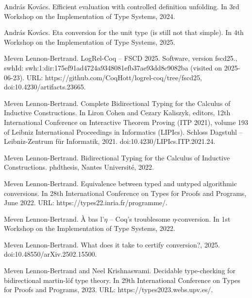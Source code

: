 \par\noindent  [27]  András Kovács.  Efficient evaluation with controlled definition unfolding.  In 3rd Workshop on the Implementation of Type Systems, 2024.  
 
\par\noindent  [28]  András Kovács.  Eta conversion for the unit type (is still not that simple).  In 4th Workshop on the Implementation of Type Systems, 2025.  
 
\par\noindent  [29]  Meven Lennon-Bertrand.  LogRel-Coq – FSCD 2025.  Software, version fscd25., swhId: swh:1:dir:175ef91ad4724a9348081efb37ae93dd8c9082ba (visited on 2025-06-23).  URL: https://github.com/CoqHott/logrel-coq/tree/fscd25, doi:10.4230/artifacts.23665.  
 
\par\noindent  [30]  Meven Lennon-Bertrand.  Complete Bidirectional Typing for the Calculus of Inductive Constructions.  In Liron Cohen and Cezary Kaliszyk, editors, 12th International Conference on Interactive Theorem Proving (ITP 2021), volume 193 of Leibniz International Proceedings in Informatics (LIPIcs). Schloss Dagstuhl – Leibniz-Zentrum für Informatik, 2021.  doi:10.4230/LIPIcs.ITP.2021.24.  
 
\par\noindent  [31]  Meven Lennon-Bertrand.  Bidirectional Typing for the Calculus of Inductive Constructions.  phdthesis, Nantes Université, 2022.  
 
\par\noindent  [32]  Meven Lennon-Bertrand.  Equivalence between typed and untyped algorithmic conversions.  In 28th International Conference on Types for Proofs and Programs, June 2022.  URL: https://types22.inria.fr/programme/.  
 
\par\noindent  [33]  Meven Lennon-Bertrand.  À bas l’$\eta$ – Coq’s troublesome $\eta$-conversion.  In 1st Workshop on the Implementation of Type Systems, 2022.  
 
\par\noindent  [34]  Meven Lennon-Bertrand.  What does it take to certify conversion?, 2025.  doi:10.48550/arXiv.2502.15500.  
 
\par\noindent  [35]  Meven Lennon-Bertrand and Neel Krishnaswami.  Decidable type-checking for bidirectional martin-löf type theory.  In 29th International Conference on Types for Proofs and Programs, 2023.  URL: https://types2023.webs.upv.es/.  
 

